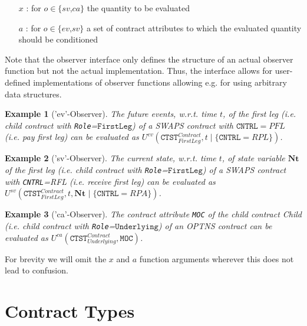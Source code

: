 \documentclass[9pt,oneside]{amsart}
\newtheorem{example}{Example}
\newcommand{\svar}[2]{\textbf{#1}_{#2}}
\newcommand{\attr}[1]{\texttt{#1}}
\newcommand{\cldev}[3]{U^{ev}(#1,#2 \mid\{#3\})}
\newcommand{\cldsv}[4]{U^{sv}(#1,#2,\svar{#3}{} \mid\{#4\})}
\newcommand{\cldca}[2]{U^{ca}(#1,#2)}
\begin{document}
\begin{multicols}{2}
\begin{itemize}
	\item [$x$]: for $o\in\{\textit{sv,ca}\}$ the quantity to be evaluated

	\item [$a$]: for $o\in\{\textit{ev,sv}\}$ a set of contract attributes to which the evaluated quantity should be conditioned
\end{itemize}


Note that the observer interface only defines the structure of an actual observer function but not the actual implementation. Thus, the interface allows for user-defined implementations of observer functions allowing e.g. for using arbitrary data structures.

\begin{example}['ev'-Observer] The future events, w.r.t. time $t$, of the \textit{first leg} (i.e. child contract with \verb'Role'=$\texttt{FirstLeg}$) of a SWAPS contract with $\attr{CNTRL}=PFL$ (i.e. \textit{pay first leg}) can be evaluated as $\cldev{\attr{CTST}_{FirstLeg}^{Contract}}{t}{\attr{CNTRL}=RPL}$.
\end{example}

\begin{example}['sv'-Observer] The current state, w.r.t. time $t$, of state variable $\svar{Nt}{}$ of the \textit{first leg} (i.e. child contract with \verb'Role'=$\texttt{FirstLeg}$) of a SWAPS contract with \attr{CNTRL}=RFL (i.e. \textit{receive first leg}) can be evaluated as $\cldsv{\attr{CTST}_{FirstLeg}^{Contract}}{t}{Nt}{\attr{CNTRL}=RPA}$.
\end{example}

\begin{example}['ca'-Observer] The contract attribute \attr{MOC} of the child contract \textit{Child} (i.e. child contract with \verb'Role'=$\texttt{Underlying}$) of an OPTNS contract can be evaluated as $\cldca{\attr{CTST}_{Underlying}^{Contract}}{\attr{MOC}}$.
\end{example}

For brevity we will omit the $x$ and $a$ function arguments wherever this does not lead to confusion.




\end{multicols}

\newpage

\section{Contract Types}\label{sec:contracts}
\end{document}
